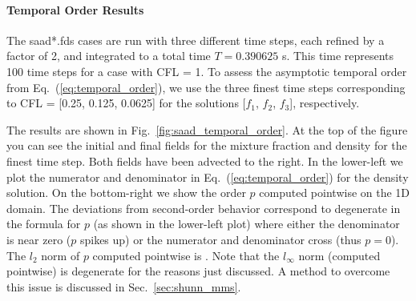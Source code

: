 \documentclass[11pt]{book}
\begin{document}
\paragraph{Temporal Order Results} The {\ct saad*.fds} cases are run with three different time steps, each refined by a factor of 2, and integrated to a total time $T=0.390625$ s.  This time represents 100 time steps for a case with CFL = 1.  To assess the asymptotic temporal order from Eq.~(\ref{eq:temporal_order}), we use the three finest time steps corresponding to CFL = [0.25, 0.125, 0.0625] for the solutions [$f_1$, $f_2$, $f_3$], respectively.

The results are shown in Fig.~\ref{fig:saad_temporal_order}.  At the top of the figure you can see the initial and final fields for the mixture fraction and density for the finest time step.  Both fields have been advected to the right.  In the lower-left we plot the numerator and denominator in Eq.~(\ref{eq:temporal_order}) for the density solution.  On the bottom-right we show the order $p$ computed pointwise on the 1D domain. The deviations from second-order behavior correspond to degenerate in the formula for $p$ (as shown in the lower-left plot) where either the denominator is near zero ($p$ spikes up) or the numerator and denominator cross (thus $p=0$).  The $l_2$ norm of $p$ computed pointwise is \!.  Note that the $l_\infty$ norm (computed pointwise) is degenerate for the reasons just discussed.  A method to overcome this issue is discussed in Sec.~\ref{sec:shunn_mms}.
\end{document}
